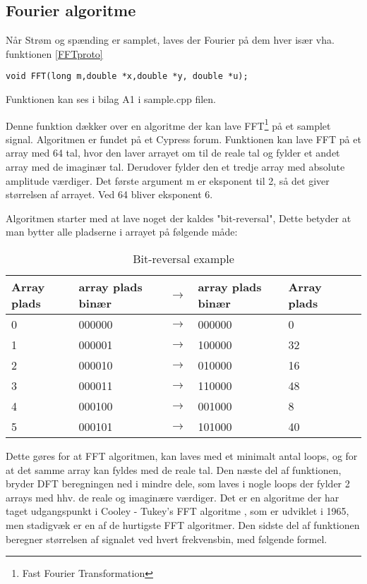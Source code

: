 
\subsection{Fourier algoritme}
Når Strøm og spænding er samplet, laves der Fourier på dem hver især vha. funktionen \ref{FFTproto}

\begin{lstlisting}
void FFT(long m,double *x,double *y, double *u);
\end{lstlisting}
Funktionen kan ses i bilag A1 i sample.cpp filen.

Denne funktion dækker over en algoritme der kan lave FFT\footnote{Fast Fourier Transformation} på et samplet signal. Algoritmen er fundet på et Cypress forum\cite{FFTalgo}. Funktionen kan lave FFT på et array med 64 tal, hvor den laver arrayet om til de reale tal og fylder et andet array med de imaginær tal. Derudover fylder den et tredje array med absolute amplitude værdiger. Det første argument m er eksponent til 2, så det giver størrelsen af arrayet. Ved 64 bliver eksponent 6.

Algoritmen starter med at lave noget der kaldes "bit-reversal", Dette betyder at man bytter alle pladserne i arrayet på følgende måde:

\begin{table}[H] 
	\centering 
	\begin{tabular}{|l|l|l|l|l|l|} %
		\hline 	%
		Array plads		&array plads binær & $\rightarrow$ 	&array plads binær    	&Array plads 	 \\ \hline 	%
		0		 	& 000000  				& $\rightarrow$ &000000				&0 	 \\ \hline 
		1		 	& 000001  				& $\rightarrow$ &100000				&32	 \\ \hline
		2		 	& 000010  				& $\rightarrow$ &010000				&16	 \\ \hline
		3		 	& 000011  				& $\rightarrow$ &110000				&48	 \\ \hline 
		4		 	& 000100  				& $\rightarrow$ &001000				&8	 \\ \hline 
		5		 	& 000101  				& $\rightarrow$ &101000				&40 \\ \hline   
	\end{tabular} 
	\caption{Bit-reversal example} 
	\label{tab:bit} 
\end{table}
Dette gøres for at FFT algoritmen, kan laves med et minimalt antal loops, og for at det samme array kan fyldes med de reale tal. Den næste del af funktionen, bryder DFT beregningen ned i mindre dele, som laves i nogle loops der fylder 2 arrays med hhv. de reale og imaginære værdiger. Det er en algoritme der har taget udgangspunkt i Cooley - Tukey's FFT algoritme \cite{Cooley}, som er udviklet i 1965, men stadigvæk er en af de hurtigste FFT algoritmer. Den sidste del af funktionen beregner størrelsen af signalet ved hvert frekvensbin, med følgende formel.



